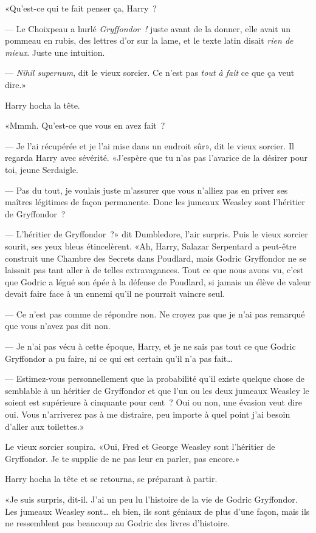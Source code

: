 «Qu'est-ce qui te fait penser ça, Harry~?

--- Le Choixpeau a hurlé \emph{Gryffondor~!} juste avant de la donner, elle avait un pommeau en rubis, des lettres d'or sur la lame, et le texte latin disait \emph{rien de mieux}. Juste une intuition.

--- \emph{Nihil supernum}, dit le vieux sorcier. Ce n'est pas \emph{tout à fait} ce que ça veut dire.»

Harry hocha la tête.

«Mmmh. Qu'est-ce que vous en avez fait~?

--- Je l'ai récupérée et je l'ai mise dans un endroit sûr», dit le vieux sorcier. Il regarda Harry avec sévérité. «J'espère que tu n'as pas l'avarice de la désirer pour toi, jeune Serdaigle.

--- Pas du tout, je voulais juste m'assurer que vous n'alliez pas en priver ses maîtres légitimes de façon permanente. Donc les jumeaux Weasley sont l'héritier de Gryffondor~?

--- L'héritier de Gryffondor~?» dit Dumbledore, l'air surpris. Puis le vieux sorcier sourit, ses yeux bleus étincelèrent. «Ah, Harry, Salazar Serpentard a peut-être construit une Chambre des Secrets dans Poudlard, mais Godric Gryffondor ne se laissait pas tant aller à de telles extravagances. Tout ce que nous avons vu, c'est que Godric a légué son épée à la défense de Poudlard, si jamais un élève de valeur devait faire face à un ennemi qu'il ne pourrait vaincre seul.

--- Ce n'est pas comme de répondre non. Ne croyez pas que je n'ai pas remarqué que vous n'avez pas dit non.

--- Je n'ai pas vécu à cette époque, Harry, et je ne sais pas tout ce que Godric Gryffondor a pu faire, ni ce qui est certain qu'il n'a pas fait…

--- Estimez-vous personnellement que la probabilité qu'il existe quelque chose de semblable à un héritier de Gryffondor et que l'un ou les deux jumeaux Weasley le soient est supérieure à cinquante pour cent~? Oui ou non, une évasion veut dire oui. Vous n'arriverez pas à me distraire, peu importe à quel point j'ai besoin d'aller aux toilettes.»

Le vieux sorcier soupira. «Oui, Fred et George Weasley sont l'héritier de Gryffondor. Je te supplie de ne pas leur en parler, pas encore.»

Harry hocha la tête et se retourna, se préparant à partir.

«Je suis surpris, dit-il. J'ai un peu lu l'histoire de la vie de Godric Gryffondor. Les jumeaux Weasley sont… eh bien, ils sont géniaux de plus d'une façon, mais ils ne ressemblent pas beaucoup au Godric des livres d'histoire.

